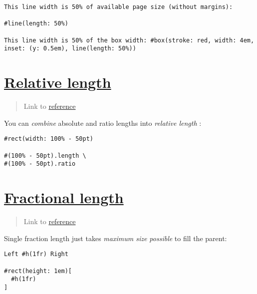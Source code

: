 \begin{verbatim}
This line width is 50% of available page size (without margins):

#line(length: 50%)

This line width is 50% of the box width: #box(stroke: red, width: 4em, inset: (y: 0.5em), line(length: 50%))
\end{verbatim}

\pandocbounded{}

\section{\texorpdfstring{\hyperref[relative-length]{Relative
length}}{Relative length}}\label{relative-length}

\begin{quote}
Link to
\href{https://typst.app/docs/reference/layout/relative/}{reference}
\end{quote}

You can \emph{combine} absolute and ratio lengths into \emph{relative
length} :

\begin{verbatim}
#rect(width: 100% - 50pt)

#(100% - 50pt).length \
#(100% - 50pt).ratio
\end{verbatim}

\pandocbounded{}

\section{\texorpdfstring{\hyperref[fractional-length]{Fractional
length}}{Fractional length}}\label{fractional-length}

\begin{quote}
Link to
\href{https://typst.app/docs/reference/layout/fraction/}{reference}
\end{quote}

Single fraction length just takes \emph{maximum size possible} to fill
the parent:

\begin{verbatim}
Left #h(1fr) Right

#rect(height: 1em)[
  #h(1fr)
]
\end{verbatim}

\pandocbounded{}

